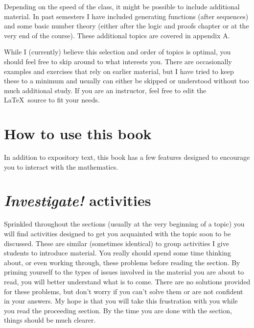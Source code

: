 \documentclass[10pt,]{book}
\theoremstyle{plain}
\theoremstyle{definition}
\theoremstyle{definition}
\theoremstyle{definition}
\numberwithin{equation}{section}
\begin{document}
Depending on the speed of the class, it might be possible to include additional material. In past semesters I have included generating functions (after sequences) and some basic number theory (either after the logic and proofs chapter or at the very end of the course). These additional topics are covered in appendix A.
%
\par

While I (currently) believe this selection and order of topics is optimal, you should feel free to skip around to what interests you. There are occasionally examples and exercises that rely on earlier material, but I have tried to keep these to a minimum and usually can either be skipped or understood without too much additional study. If you are an instructor, feel free to edit the \LaTeX{}~source to fit your needs.
%
\chapter*{How to use this book}\label{preface-2}
\typeout{************************************************}
\typeout{************************************************}

  In addition to expository text, this book has a few features designed to encourage you to interact with the mathematics.
\chapter*{\emph{Investigate!} activities}\label{preface-3}

  Sprinkled throughout the sections (usually at the very beginning of a topic) you will find activities designed to get you acquainted with the topic soon to be discussed. These are similar (sometimes identical) to group activities I give students to introduce material. You really should spend some time thinking about, or even working through, these problems before reading the section. By priming yourself to the types of issues involved in the material you are about to read, you will better understand what is to come. There are no solutions provided for these problems, but don't worry if you can't solve them or are not confident in your answers. My hope is that you will take this frustration with you while you read the proceeding section. By the time you are done with the section, things should be much clearer.
\end{document}
